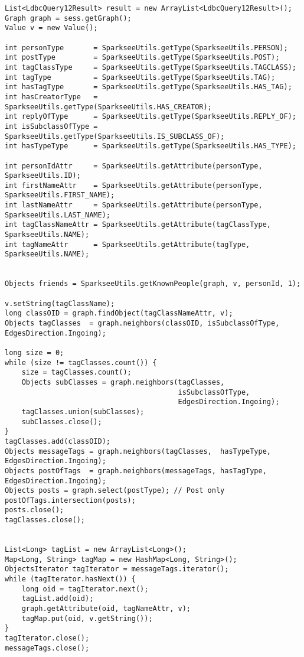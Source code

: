 {\footnotesize
\begin{verbatim}
List<LdbcQuery12Result> result = new ArrayList<LdbcQuery12Result>();
Graph graph = sess.getGraph();
Value v = new Value();

int personType       = SparkseeUtils.getType(SparkseeUtils.PERSON);
int postType         = SparkseeUtils.getType(SparkseeUtils.POST);
int tagClassType     = SparkseeUtils.getType(SparkseeUtils.TAGCLASS);
int tagType          = SparkseeUtils.getType(SparkseeUtils.TAG);
int hasTagType       = SparkseeUtils.getType(SparkseeUtils.HAS_TAG);
int hasCreatorType   = SparkseeUtils.getType(SparkseeUtils.HAS_CREATOR);
int replyOfType      = SparkseeUtils.getType(SparkseeUtils.REPLY_OF);
int isSubclassOfType = SparkseeUtils.getType(SparkseeUtils.IS_SUBCLASS_OF);
int hasTypeType      = SparkseeUtils.getType(SparkseeUtils.HAS_TYPE);

int personIdAttr     = SparkseeUtils.getAttribute(personType,   SparkseeUtils.ID);
int firstNameAttr    = SparkseeUtils.getAttribute(personType,   SparkseeUtils.FIRST_NAME);
int lastNameAttr     = SparkseeUtils.getAttribute(personType,   SparkseeUtils.LAST_NAME);
int tagClassNameAttr = SparkseeUtils.getAttribute(tagClassType, SparkseeUtils.NAME);
int tagNameAttr      = SparkseeUtils.getAttribute(tagType,      SparkseeUtils.NAME);


Objects friends = SparkseeUtils.getKnownPeople(graph, v, personId, 1);

v.setString(tagClassName);
long classOID = graph.findObject(tagClassNameAttr, v);
Objects tagClasses  = graph.neighbors(classOID, isSubclassOfType, EdgesDirection.Ingoing);

long size = 0;
while (size != tagClasses.count()) {
    size = tagClasses.count();
    Objects subClasses = graph.neighbors(tagClasses, 
                                         isSubclassOfType, 
                                         EdgesDirection.Ingoing);
    tagClasses.union(subClasses);
    subClasses.close();
}
tagClasses.add(classOID);
Objects messageTags = graph.neighbors(tagClasses,  hasTypeType, EdgesDirection.Ingoing);
Objects postOfTags  = graph.neighbors(messageTags, hasTagType,  EdgesDirection.Ingoing);
Objects posts = graph.select(postType); // Post only
postOfTags.intersection(posts);
posts.close();
tagClasses.close();


List<Long> tagList = new ArrayList<Long>();
Map<Long, String> tagMap = new HashMap<Long, String>();
ObjectsIterator tagIterator = messageTags.iterator();
while (tagIterator.hasNext()) {
    long oid = tagIterator.next();
    tagList.add(oid);
    graph.getAttribute(oid, tagNameAttr, v);
    tagMap.put(oid, v.getString());
}
tagIterator.close();
messageTags.close();


\end{verbatim}}
